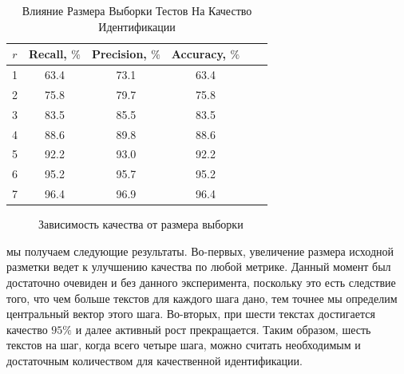 \documentclass[12pt]{article}
\begin{document}
\begin{table}[h!]
\centering
\begin{tabular}{||c|c|c|c|c|c||}
\hline
$r$ & Recall, $\%$ &Precision, $\%$ &Accuracy, $\%$ \\
\hline
1 &	63.4 &	73.1 &	63.4 \\
\hline
2 &	75.8 &	79.7 &	75.8 \\
\hline
3 &	83.5 &	85.5 &	83.5 \\
\hline
4 &	88.6 &	89.8 &	88.6\\
\hline
5 &	92.2 &	93.0 &	92.2\\
\hline
6 &	95.2 &	95.7 &	95.2\\
\hline
7 &	96.4 &	96.9 &	96.4\\
\hline
\end{tabular}
\caption{Влияние Размера Выборки Тестов На Качество Идентификации}
\label{table:5}
\end{table}

\begin{figure}[h!]
\label{fig:image1}
 \caption{Зависимость качества от размера выборки}
\end{figure}

мы получаем  следующие результаты. Во-первых, увеличение размера исходной разметки ведет к улучшению качества по любой метрике. Данный момент был достаточно очевиден и без данного эксперимента, поскольку это есть следствие того, что чем больше текстов для каждого шага дано, тем точнее мы определим центральный вектор этого шага. Во-вторых, при шести текстах достигается качество $95\%$ и далее активный рост прекращается. Таким образом, шесть текстов на шаг, когда всего четыре шага, можно считать необходимым и достаточным количеством для качественной идентификации. 
\end{document}
